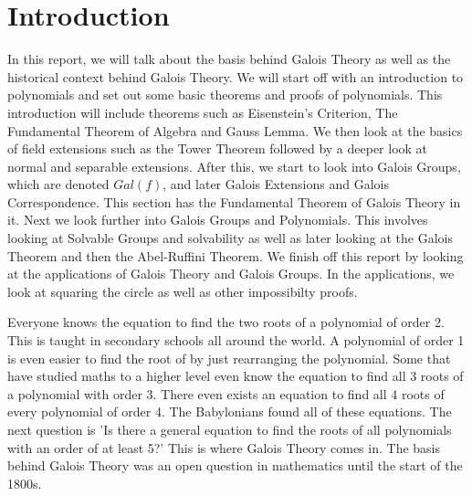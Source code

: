 
\section{Introduction}

In this report, we will talk about the basis behind Galois Theory as well as the historical context behind Galois Theory. We will start off with an introduction to polynomials and set out some basic theorems and proofs of polynomials. This introduction will include theorems such as Eisenstein's Criterion, The Fundamental Theorem of Algebra and Gauss Lemma. We then look at the basics of field extensions such as the Tower Theorem followed by a deeper look at normal and separable extensions. After this, we start to look into Galois Groups, which are denoted $Gal(f)$, and later Galois Extensions and Galois Correspondence. This section has the Fundamental Theorem of Galois Theory in it. Next we look further into Galois Groups and Polynomials. This involves looking at Solvable Groups and solvability as well as later looking at the Galois Theorem and then the Abel-Ruffini Theorem. We finish off this report by looking at the applications of Galois Theory and Galois Groups. In the applications, we look at squaring the circle as well as other impossibilty proofs.

Everyone knows the equation to find the two roots of a polynomial of order 2. This is taught in secondary schools all around the world. A polynomial of order 1 is even easier to find the root of by just rearranging the polynomial. Some that have studied maths to a higher level even know the equation to find all 3 roots of a polynomial with order 3. There even exists an equation to find all 4 roots of every polynomial of order 4. The Babylonians found all of these equations. The next question is 'Is there a general equation to find the roots of all polynomials with an order of at least 5?' This is where Galois Theory comes in. The basis behind Galois Theory was an open question in mathematics until the start of the 1800s.

